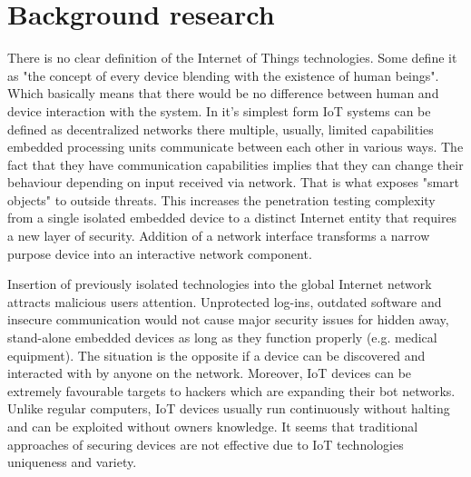 \section{Background research}
There is no clear definition of the Internet of Things technologies. Some define it as "the concept of every device blending with the existence of human beings"\cite{DBLP:journals/corr/MendezPY17}. Which basically means that there would be no difference between human and device interaction with the system. In it's simplest form IoT systems can be defined as decentralized networks there multiple, usually, limited capabilities embedded processing units communicate between each other in various ways. The fact that they have communication capabilities implies that they can change their behaviour depending on input received via network. That is what exposes "smart objects" to outside threats\cite{riahi:hal-00868362}. This increases the penetration testing complexity from a single isolated embedded device to a distinct Internet entity that requires a new layer of security. Addition of a network interface transforms a narrow purpose device into an interactive network component.

Insertion of previously isolated technologies into the global Internet network attracts malicious users attention. Unprotected log-ins, outdated software and insecure communication would not cause major security issues for hidden away, stand-alone embedded devices as long as they function properly (e.g. medical equipment). The situation is the opposite if a device can be discovered and interacted with by anyone on the network. Moreover, IoT devices can be extremely favourable targets to hackers which are expanding their bot networks. Unlike regular computers, IoT devices usually run continuously without halting and can be exploited without owners knowledge\cite{191952}. It seems that traditional approaches of securing devices are not effective\cite{DBLP:journals/corr/abs-1803-05022} due to IoT technologies uniqueness and variety.


